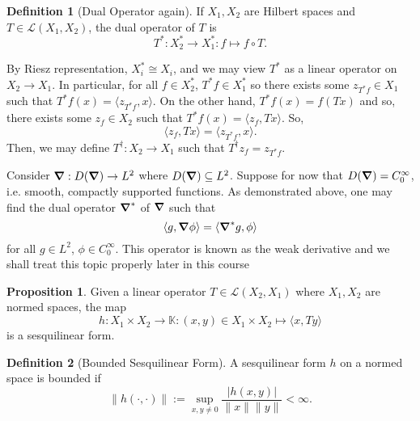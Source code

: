 \documentclass[]{article}
\theoremstyle{definition}
\theoremstyle{definition}
\newtheorem{definition}{Definition}[section]
\newtheorem{proposition}{Proposition}[section]
\begin{document}
\begin{definition}[Dual Operator again]
  If \(X_1, X_2\) are Hilbert spaces and \(T \in \mathcal{L}(X_1, X_2)\), 
  the dual operator of \(T\) is 
  \[T^* : X_2^* \to X_1^* : f \mapsto f \circ T.\]
\end{definition}

By Riesz representation, \(X_i^* \cong X_i\), and we may view \(T^*\) as a 
linear operator on \(X_2 \to X_1\). In particular, for all \(f \in X_2^*\), 
\(T^* f \in X_1^*\) so there exists some \(z_{T^* f} \in X_1\) such that 
\(T^* f(x) = \langle z_{T^* f}, x \rangle\). On the other hand, 
\(T^* f(x) = f(Tx)\) and so, there exists some \(z_f \in X_2\) such that 
\(T^* f(x) = \langle z_f, T x\rangle\). So, 
\[\langle z_f, T x \rangle = \langle z_{T^*f}, x\rangle.\]
Then, we may define \(T^\dagger : X_2 \to X_1\) such that 
\(T^\dagger z_f = z_{T^* f}\).

Consider \(\grad : D(\grad) \to L^2\) where 
\(D(\grad) \subseteq L^2\). Suppose for now that \(D(\grad) = C_0^\infty\), i.e. 
smooth, compactly supported functions. As demonstrated above, one may find the 
dual operator \(\grad^*\) of \(\grad\) such that 
\[\langle g, \grad \phi\rangle = \langle \grad^* g, \phi\rangle\]
for all \(g \in L^2\), \(\phi \in C_0^\infty\). This operator is known as 
the weak derivative and we shall treat this topic 
properly later in this course

\begin{proposition}
  Given a linear operator \(T \in \mathcal{L}(X_2, X_1)\) 
  where \(X_1, X_2\) are normed spaces, the map 
  \[h : X_1 \times X_2 \to \mathbb{K}: 
    (x, y) \in X_1 \times X_2 \mapsto \langle x, Ty \rangle\] 
  is a sesquilinear form.
\end{proposition}

\begin{definition}[Bounded Sesquilinear Form]
  A sesquilinear form \(h\) on a normed space is bounded if 
  \[\|h(\cdot, \cdot)\| := \sup_{x, y \neq 0} \frac{|h(x, y)|}{\|x\|\|y\|} < \infty.\]
\end{definition}
\end{document}
